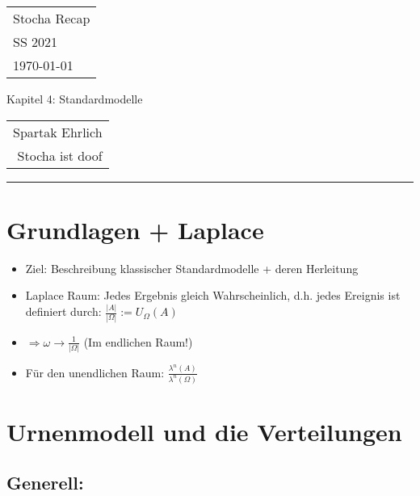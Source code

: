\documentclass[a4paper,11pt]{scrartcl}
\begin{document}
{\raggedright
\begin{tabular}{l}
    Stocha Recap \\
    SS 2021 \\
    \today{}
\end{tabular}}
\hfill
{\Large Kapitel 4: Standardmodelle}
\hfill
\begin{tabular}{r}
    Spartak Ehrlich \\
    Stocha ist doof
\end{tabular}
\hrule

\section{Grundlagen + Laplace}
\begin{itemize}
    \item Ziel: Beschreibung klassischer Standardmodelle + deren Herleitung
    \item Laplace Raum: Jedes Ergebnis gleich Wahrscheinlich, d.h. jedes Ereignis ist definiert durch: $\frac{|A|}{|\Omega|} := U_\Omega (A)$
    \item $\Rightarrow \omega \rightarrow \frac{1}{|\Omega|}$ (Im endlichen Raum!)
    \item Für den unendlichen Raum: $\frac{\lambda ^n (A)}{\lambda^n (\Omega)}$
\end{itemize}

\section{Urnenmodell und die Verteilungen}

\subsection{Generell:}
\end{document}

